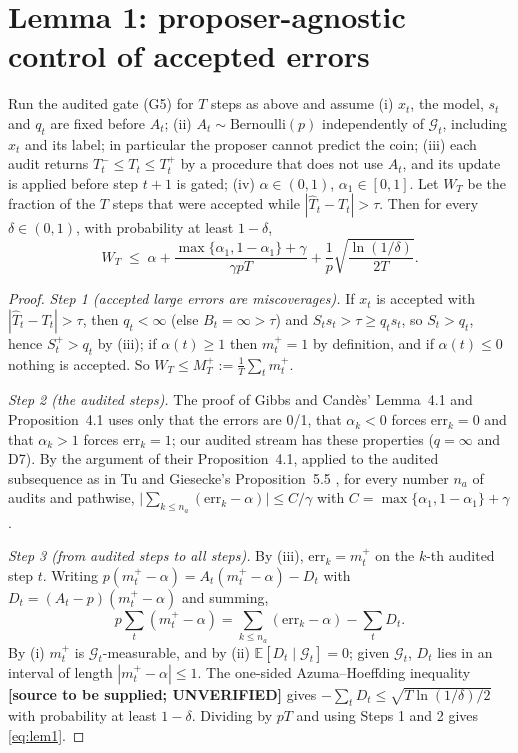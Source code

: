 \section{Lemma 1: proposer-agnostic control of accepted errors}
\begin{lemma}\label{lem:1}
Run the audited gate (G5) for $T$ steps as above and assume
(i) $x_t$, the model, $s_t$ and $q_t$ are fixed before $A_t$;
(ii) $A_t\sim\mathrm{Bernoulli}(p)$ independently of $\mathcal G_t$, including $x_t$ and its
label; in particular the proposer cannot predict the coin;
(iii) each audit returns $T^-_t\le T_t\le T^+_t$ by a procedure that does not use $A_t$, and its
update is applied before step $t+1$ is gated;
(iv) $\alpha\in(0,1)$, $\alpha_1\in[0,1]$.
Let $W_T$ be the fraction of the $T$ steps that were accepted while
$|\hat T_t - T_t|>\tau$. Then for every $\delta\in(0,1)$, with probability at least $1-\delta$,
\begin{equation}\label{eq:lem1}
  W_T \;\le\; \alpha + \frac{\max\{\alpha_1,1-\alpha_1\}+\gamma}{\gamma p T}
        + \frac{1}{p}\sqrt{\frac{\ln(1/\delta)}{2T}} .
\end{equation}
\end{lemma}

\begin{proof}
\emph{Step 1 (accepted large errors are miscoverages).} If $x_t$ is accepted with
$|\hat T_t - T_t|>\tau$, then $q_t<\infty$ (else $B_t=\infty>\tau$) and
$S_t s_t > \tau \ge q_t s_t$, so $S_t>q_t$, hence $S^+_t>q_t$ by (iii); if $\alpha(t)\ge1$ then
$m^+_t=1$ by definition, and if $\alpha(t)\le0$ nothing is accepted. So
$W_T \le M^+_T := \frac1T\sum_t m^+_t$.

\emph{Step 2 (the audited steps).} The proof of Gibbs and Cand\`es' Lemma~4.1 and
Proposition~4.1 \cite{gibbs2021aci} uses only that the errors are 0/1, that $\alpha_k<0$ forces
$\mathrm{err}_k=0$ and that $\alpha_k>1$ forces $\mathrm{err}_k=1$; our audited stream has these
properties ($q=\infty$ and D7). By the argument of their Proposition~4.1, applied to the audited
subsequence as in Tu and Giesecke's Proposition~5.5 \cite{tu2026}, for every number $n_a$ of
audits and pathwise,
$\bigl|\sum_{k\le n_a}(\mathrm{err}_k-\alpha)\bigr| \le C/\gamma$ with
$C=\max\{\alpha_1,1-\alpha_1\}+\gamma$.

\emph{Step 3 (from audited steps to all steps).} By (iii), $\mathrm{err}_k = m^+_t$ on the $k$-th
audited step $t$. Writing $p(m^+_t-\alpha) = A_t(m^+_t-\alpha) - D_t$ with
$D_t = (A_t-p)(m^+_t-\alpha)$ and summing,
\[
  p\sum_t (m^+_t-\alpha) = \sum_{k\le n_a}(\mathrm{err}_k-\alpha) - \sum_t D_t .
\]
By (i) $m^+_t$ is $\mathcal G_t$-measurable, and by (ii) $\mathbb E[D_t\mid\mathcal G_t]=0$;
given $\mathcal G_t$, $D_t$ lies in an interval of length $|m^+_t-\alpha|\le1$. The one-sided
Azuma--Hoeffding inequality \textbf{[source to be supplied; UNVERIFIED]} gives
$-\sum_t D_t \le \sqrt{T\ln(1/\delta)/2}$ with probability at least $1-\delta$. Dividing by $pT$
and using Steps 1 and 2 gives \eqref{eq:lem1}.
\end{proof}

